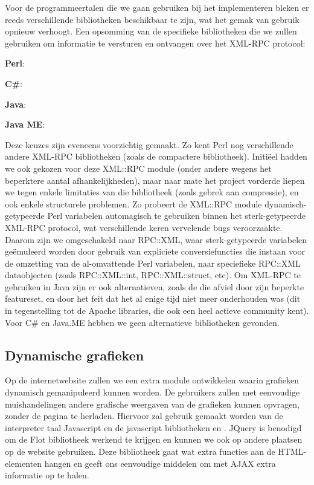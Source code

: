 Voor de programmeertalen die we gaan gebruiken bij het implementeren bleken er reeds verschillende bibliotheken beschikbaar te zijn, wat het gemak van gebruik opnieuw verhoogt. Een opsomming van de specifieke bibliotheken die we zullen gebruiken om informatie te versturen en ontvangen over het XML-RPC protocol:
\begin{itemize_compact}
\item{\textbf{Perl}: }
\item{\textbf{C\#}: }
\item{\textbf{Java}: }
\item{\textbf{Java ME}: }
\end{itemize_compact}

Deze keuzes zijn eveneens voorzichtig gemaakt. Zo kent Perl nog verschillende andere XML-RPC bibliotheken (zoals de compactere  bibliotheek). Initi\"eel hadden we ook gekozen voor deze XML::RPC module (onder andere wegens het beperktere aantal afhankelijkheden), maar naar mate het project vorderde liepen we tegen enkele limitaties van die bibliotheek (zoals gebrek aan compressie), en ook enkele structurele problemen. Zo probeert de XML::RPC module dynamisch-getypeerde Perl variabelen automagisch te gebruiken binnen het sterk-getypeerde XML-RPC protocol, wat verschillende keren vervelende bugs veroorzaakte. Daarom zijn we omgeschakeld naar RPC::XML, waar sterk-getypeerde variabelen ge\"emuleerd worden door gebruik van expliciete conversiefuncties die instaan voor de omzetting van de al-omvattende Perl variabelen, naar speciefieke RPC::XML dataobjecten (zoals RPC::XML::int, RPC::XML::struct, etc).
Om XML-RPC te gebruiken in Java zijn er ook alternatieven, zoals de  die afviel door zijn beperkte featureset, en door het feit dat het al enige tijd niet meer onderhouden was (dit in tegenstelling tot de Apache libraries, die ook een heel actieve community kent).
Voor C\# en Java.ME hebben we geen alternatieve bibliotheken gevonden.

\subsection{Dynamische grafieken}

Op de internetwebsite zullen we een extra module ontwikkelen waarin grafieken dynamisch gemanipuleerd kunnen worden. De gebruikers zullen met eenvoudige muishandelingen andere grafische weergaven van de grafieken kunnen opvragen, zonder de pagina te herladen. Hiervoor zal gebruik gemaakt worden van de interpreter taal Javascript en de javascript bibliotheken  en . JQuery is benodigd om de Flot bibliotheek werkend te krijgen en kunnen we ook op andere plaatsen op de website gebruiken. Deze bibliotheek gaat wat extra functies aan de HTML-elementen hangen en geeft ons eenvoudige middelen om met AJAX extra informatie op te halen.

